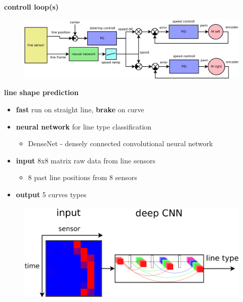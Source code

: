 \documentclass[xcolor=dvipsnames]{beamer}
\begin{document}
\begin{frame}{\bf controll loop(s)}
        \begin{figure}
            \includegraphics[scale=0.22]{../diagrams/line_following.png}
        \end{figure}
\end{frame}






\begin{frame}{\bf line shape prediction}

\begin{itemize}
    \item {\bf fast} run on straight line, {\bf brake} on curve
    \item {\bf neural network} for line type classification
        \begin{itemize}
            \item DenseNet - densely connected convolutional neural network
        \end{itemize}
    \item {\bf input} 8x8 matrix raw data from line sensors
        \begin{itemize}
            \item 8 past line positions from 8 sensors
        \end{itemize}
    \item {\bf output} 5 curves types
\end{itemize}

\begin{figure}
    \includegraphics[scale=0.3]{../images/line_classification.png}
\end{figure}

\end{frame}
\end{document}
